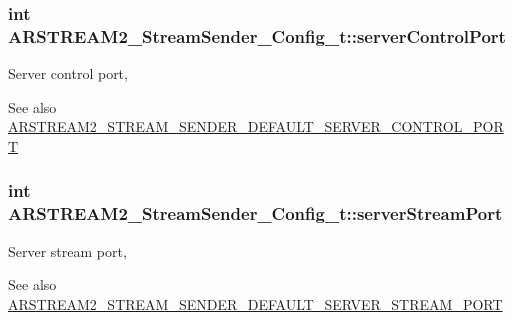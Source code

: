 \subsubsection[{\texorpdfstring{server\+Control\+Port}{serverControlPort}}]{\setlength{\rightskip}{0pt plus 5cm}int A\+R\+S\+T\+R\+E\+A\+M2\+\_\+\+Stream\+Sender\+\_\+\+Config\+\_\+t\+::server\+Control\+Port}\hypertarget{struct_a_r_s_t_r_e_a_m2___stream_sender___config__t_aa0792f0abdf2ea6b6fbf08d68d550a1e}{}\label{struct_a_r_s_t_r_e_a_m2___stream_sender___config__t_aa0792f0abdf2ea6b6fbf08d68d550a1e}
Server control port, \begin{DoxySeeAlso}{See also}
\hyperlink{arstream2__stream__sender_8h_ac9aa7341ddea21d77c88b23f1c88ee91}{A\+R\+S\+T\+R\+E\+A\+M2\+\_\+\+S\+T\+R\+E\+A\+M\+\_\+\+S\+E\+N\+D\+E\+R\+\_\+\+D\+E\+F\+A\+U\+L\+T\+\_\+\+S\+E\+R\+V\+E\+R\+\_\+\+C\+O\+N\+T\+R\+O\+L\+\_\+\+P\+O\+RT} 
\end{DoxySeeAlso}
\subsubsection[{\texorpdfstring{server\+Stream\+Port}{serverStreamPort}}]{\setlength{\rightskip}{0pt plus 5cm}int A\+R\+S\+T\+R\+E\+A\+M2\+\_\+\+Stream\+Sender\+\_\+\+Config\+\_\+t\+::server\+Stream\+Port}\hypertarget{struct_a_r_s_t_r_e_a_m2___stream_sender___config__t_a33d9c51dd66d6f97de55684e27a23adc}{}\label{struct_a_r_s_t_r_e_a_m2___stream_sender___config__t_a33d9c51dd66d6f97de55684e27a23adc}
Server stream port, \begin{DoxySeeAlso}{See also}
\hyperlink{arstream2__stream__sender_8h_a2aa04e91d84ffd1941861c1e698bb2f6}{A\+R\+S\+T\+R\+E\+A\+M2\+\_\+\+S\+T\+R\+E\+A\+M\+\_\+\+S\+E\+N\+D\+E\+R\+\_\+\+D\+E\+F\+A\+U\+L\+T\+\_\+\+S\+E\+R\+V\+E\+R\+\_\+\+S\+T\+R\+E\+A\+M\+\_\+\+P\+O\+RT} 
\end{DoxySeeAlso}

